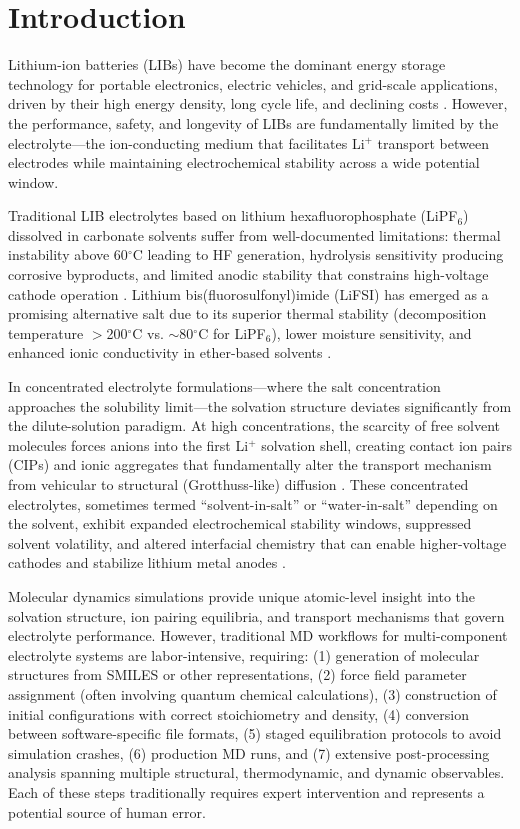 \documentclass[twocolumn,10pt]{article}
\begin{document}
\section{Introduction}
Lithium-ion batteries (LIBs) have become the dominant energy storage technology for portable electronics, electric vehicles, and grid-scale applications, driven by their high energy density, long cycle life, and declining costs \cite{armand2008}. However, the performance, safety, and longevity of LIBs are fundamentally limited by the electrolyte---the ion-conducting medium that facilitates Li$^+$ transport between electrodes while maintaining electrochemical stability across a wide potential window.

Traditional LIB electrolytes based on lithium hexafluorophosphate (LiPF$_6$) dissolved in carbonate solvents suffer from well-documented limitations: thermal instability above 60$^\circ$C leading to HF generation, hydrolysis sensitivity producing corrosive byproducts, and limited anodic stability that constrains high-voltage cathode operation \cite{eshetu2018, xu2014}. Lithium bis(fluorosulfonyl)imide (LiFSI) has emerged as a promising alternative salt due to its superior thermal stability (decomposition temperature $>$200$^\circ$C vs. $\sim$80$^\circ$C for LiPF$_6$), lower moisture sensitivity, and enhanced ionic conductivity in ether-based solvents \cite{eshetu2018, qian2015}.

In concentrated electrolyte formulations---where the salt concentration approaches the solubility limit---the solvation structure deviates significantly from the dilute-solution paradigm. At high concentrations, the scarcity of free solvent molecules forces anions into the first Li$^+$ solvation shell, creating contact ion pairs (CIPs) and ionic aggregates that fundamentally alter the transport mechanism from vehicular to structural (Grotthuss-like) diffusion \cite{borodin2015}. These concentrated electrolytes, sometimes termed ``solvent-in-salt'' or ``water-in-salt'' depending on the solvent, exhibit expanded electrochemical stability windows, suppressed solvent volatility, and altered interfacial chemistry that can enable higher-voltage cathodes and stabilize lithium metal anodes \cite{suo2015}.

Molecular dynamics simulations provide unique atomic-level insight into the solvation structure, ion pairing equilibria, and transport mechanisms that govern electrolyte performance. However, traditional MD workflows for multi-component electrolyte systems are labor-intensive, requiring: (1) generation of molecular structures from SMILES or other representations, (2) force field parameter assignment (often involving quantum chemical calculations), (3) construction of initial configurations with correct stoichiometry and density, (4) conversion between software-specific file formats, (5) staged equilibration protocols to avoid simulation crashes, (6) production MD runs, and (7) extensive post-processing analysis spanning multiple structural, thermodynamic, and dynamic observables. Each of these steps traditionally requires expert intervention and represents a potential source of human error.
\end{document}
